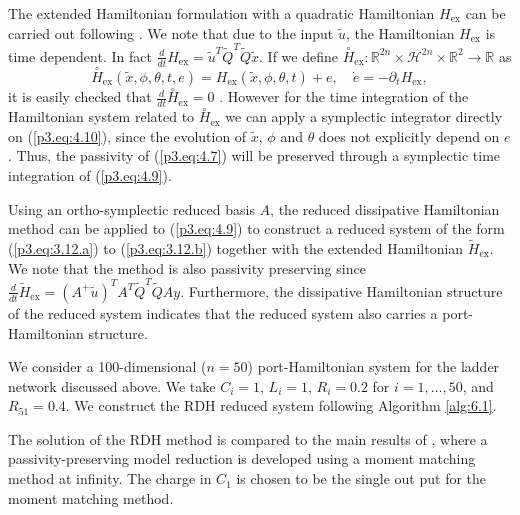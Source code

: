 The extended Hamiltonian formulation  with a quadratic Hamiltonian $H_{\text{ex}}$ can be carried out following . We note that due to the input $\tilde u$, the Hamiltonian $H_{\text{ex}}$ is time dependent. In fact $\frac{d}{dt} H_{\text{ex}} = \tilde u^T\tilde Q^T \tilde Q \tilde x$. If we define $\overset{\circ}{H}_{\text{ex}} : \mathbb R^{2n}\times \mathcal H^{2n}\times \mathbb R^{2}\to \mathbb R$ as
\begin{equation} \label{p3.eq:4.10}
	\overset{\circ}{H}_{\text{ex}}(\tilde x,\phi,\theta,t,e) = H_{\text{ex}}(\tilde x,\phi,\theta,t) + e, \quad \dot e = - \partial_t H_{\text{ex}},
\end{equation}
it is easily checked that $\frac d {dt} \overset{\circ}{H}_{\text{ex}} =0$ \cite{hairer2006geometric}. However for the time integration of the Hamiltonian system related to $\overset{\circ}{H}_{\text{ex}}$ we can apply a symplectic integrator directly on (\ref{p3.eq:4.10}), since the evolution of $\tilde x$, $\phi$ and $\theta$ does not explicitly depend on $e$. Thus, the passivity of (\ref{p3.eq:4.7}) will be preserved through a symplectic time integration of (\ref{p3.eq:4.9}).

Using an ortho-symplectic reduced basis $A$, the reduced dissipative Hamiltonian method can be applied to (\ref{p3.eq:4.9}) to construct a reduced system of the form (\ref{p3.eq:3.12.a}) to (\ref{p3.eq:3.12.b}) together with the extended Hamiltonian $\tilde H_{\text{ex}}$. We note that the method is also passivity preserving since $\frac{d}{dt} \tilde H_{\text{ex}} = (A^+ \tilde u)^T A^T \tilde Q^T \tilde Q A y$. Furthermore, the dissipative Hamiltonian structure of the reduced system indicates that the reduced system also carries a port-Hamiltonian structure.

We consider a 100-dimensional ($n=50$) port-Hamiltonian system for the ladder network discussed above. We take $C_i=1$, $L_i = 1$, $R_i=0.2$ for $i=1,\dots,50$, and $R_{51} = 0.4$. We construct the RDH reduced system following Algorithm \ref{alg:6.1}. 

The solution of the RDH method is compared to the main results of \cite{polyuga2010structure}, where a passivity-preserving model reduction is developed using a moment matching method at infinity. The charge in $C_1$ is chosen to be the single out put for the moment matching method.

